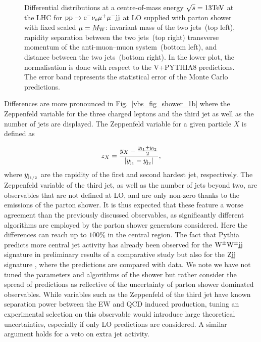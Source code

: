 \documentclass[11pt]{cernrep}
\newcommand{\VBFNLO}{V\protect\scalebox{0.8}{BFNLO}\xspace}
\begin{document}
\begin{figure}[htbp]
\begin{center}
\caption{Differential distributions at a centre-of-mass energy $\sqrt{s}=13{\rm TeV}$ at the LHC for ${\rm p} {\rm p}
  \to {\rm e}^-  \nu_{\rm e}  \mu^+ \mu^- {\rm j} {\rm j}$ at LO supplied with parton shower with fixed scaled $\mu = M_{\rm W}$: 
                invariant mass of the two jets~(top left),
                rapidity separation between the two jets~(top right)
                transverse momentum of the anti-muon--muon system~(bottom left), and
                distance between the two jets~(bottom right). 
                In the lower plot, the normalisation is done with respect to the \VBFNLO+{\sc PYTHIA8} predictions.
                The error band represents
                the statistical error of the Monte Carlo predictions.}
\label{vbs_fig_shower_1a}
\end{center}
\end{figure}

Differences are more pronounced in Fig.~\ref{vbs_fig_shower_1b} where the Zeppenfeld variable for the three charged leptons and the third jet as well as the number of jets are displayed.
The Zeppenfeld variable for a given particle $X$ is defined as

\begin{equation}
  z_{X} = \frac{y_{X}-\frac{y_{{\rm j}_1}+y_{{\rm j}_2}}2}{|y_{{\rm j}_1}-y_{{\rm j}_2}|} ,
\end{equation}
%
where $y_{{\rm j}_{1/2}}$ are the rapidity of the first and second hardest jet, respectively.
The Zeppenfeld variable of the third jet, as well as the number of jets beyond two, are observables that are not defined at LO,
and are only non-zero thanks to the emissions of the parton shower.
It is thus expected that these feature a worse agreement than the previously discussed observables, as 
significantly different algorithms are employed by the parton shower generators considered.
Here the differences can reach up to $100\%$ in the central region.
The fact that {\sc Pythia} predicts more central jet activity has already been observed for the ${\rm W}^\pm{\rm W}^\pm{\rm j}{\rm j}$ 
signature in preliminary results of a comparative study \cite{Anders:2018gfr} but also for the 
${\rm Z}{\rm j}{\rm j}$ signature \cite{Aaboud:2017emo,Sirunyan:2017jej}, where the predictions are compared with data.
We note we have not tuned the parameters and algorithms
of the shower but rather consider the spread of predictions as reflective of the uncertainty 
of parton shower dominated observables. While variables such as the Zeppenfeld of the third jet
have known separation power between the EW and QCD induced production, tuning an experimental selection 
on this observable would introduce large theoretical uncertainties, especially if only LO predictions
are considered. A similar argument holds for a veto on extra jet activity.
\end{document}
